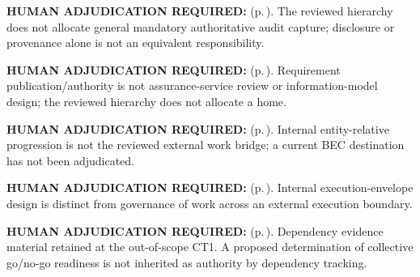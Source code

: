 \par\textbf{HUMAN ADJUDICATION REQUIRED:}  (p.\,\pageref{cap:bec-significant-activity-audit-capture}). The reviewed hierarchy does not allocate general mandatory authoritative audit capture; disclosure or provenance alone is not an equivalent responsibility.
\par\textbf{HUMAN ADJUDICATION REQUIRED:}  (p.\,\pageref{cap:bec-governance-requirement-publication-support}). Requirement publication/authority is not assurance-service review or information-model design; the reviewed hierarchy does not allocate a home.
\par\textbf{HUMAN ADJUDICATION REQUIRED:}  (p.\,\pageref{cap:bec-entity-specific-operational-coordination}). Internal entity-relative progression is not the reviewed external work bridge; a current BEC destination has not been adjudicated.
\par\textbf{HUMAN ADJUDICATION REQUIRED:}  (p.\,\pageref{cap:bec-governed-operational-activity-design}). Internal execution-envelope design is distinct from governance of work across an external execution boundary.
\par\textbf{HUMAN ADJUDICATION REQUIRED:}  (p.\,\pageref{cap:bec-service-offering-readiness-coordination}). Dependency evidence material retained at the out-of-scope CT1. A proposed determination of collective go/no-go readiness is not inherited as authority by dependency tracking.
